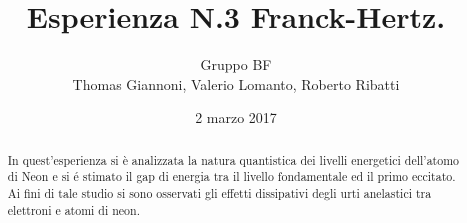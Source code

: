 \documentclass[a4paper,11pt]{article}
\author{Gruppo BF \\ Thomas Giannoni, Valerio Lomanto, Roberto Ribatti}
\title{Esperienza N.3 Franck-Hertz.}
\date{2 marzo 2017}
\begin{document}
	\maketitle
	\begin{abstract}
		In quest'esperienza si è analizzata la natura quantistica dei 
		livelli energetici dell'atomo di Neon e si é stimato il gap di energia 
		tra il livello fondamentale ed il primo eccitato. Ai fini di tale studio si sono osservati gli effetti 
		dissipativi degli urti anelastici tra elettroni e atomi di
		neon.
	\end{abstract}
	
	
\end{document}
